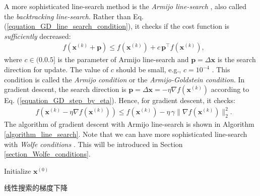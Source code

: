 \documentclass[lang=cn,10pt]{gorgeousnbook}
\numberwithin{equation}{section}%
\numberwithin{figure}{section}%
\begin{document}
A more sophisticated line-search method is the \textit{Armijo line-search} \cite{armijo1966minimization}, also called the \textit{backtracking line-search}. Rather than Eq. (\ref{equation_GD_line_search_condition}), it checks if the cost function is \textit{sufficiently} decreased:
\begin{align}\label{equation_general_Armijo_line_search_condition}
& f(\boldsymbol{x}^{(k)} + \boldsymbol{p}) \leq f(\boldsymbol{x}^{(k)}) +  c\, \boldsymbol{p}^\top f(\boldsymbol{x}^{(k)}),
\end{align}
where $c \in (0. 0.5]$ is the parameter of Armijo line-search and $\boldsymbol{p} = \Delta\boldsymbol{x}$ is the search direction for update.
The value of $c$ should be small, e.g., $c = 10^{-4}$ \cite{nocedal2006numerical}.
This condition is called the \textit{Armijo condition} or the \textit{Armijo-Goldstein condition}.
In gradient descent, the search direction is $\boldsymbol{p} = \Delta\boldsymbol{x} = -\eta \nabla f(\boldsymbol{x}^{(k)})$ according to Eq. (\ref{equation_GD_step_by_eta}). Hence, for gradient descent, it checks:
\begin{align}\label{equation_GD_Armijo_line_search_condition}
& f(\boldsymbol{x}^{(k)} -\eta \nabla f(\boldsymbol{x}^{(k)})) \leq f(\boldsymbol{x}^{(k)}) - \eta\, \gamma \|\nabla f(\boldsymbol{x}^{(k)})\|_2^2.
\end{align}
The algorithm of gradient descent with Armijo line-search is shown in Algorithm \ref{algorithm_line_search}.
Note that we can have more sophisticated line-search with \textit{Wolfe conditions} \cite{wolfe1969convergence}. This will be introduced in Section \ref{section_Wolfe_conditions}.

\SetAlCapSkip{0.5em}
\IncMargin{0.8em}
\begin{algorithm2e}[!t]
\DontPrintSemicolon
    Initialize $\boldsymbol{x}^{(0)}$\;
\caption{线性搜索的梯度下降}\label{algorithm_line_search}
\end{algorithm2e}
\DecMargin{0.8em}
\end{document}
